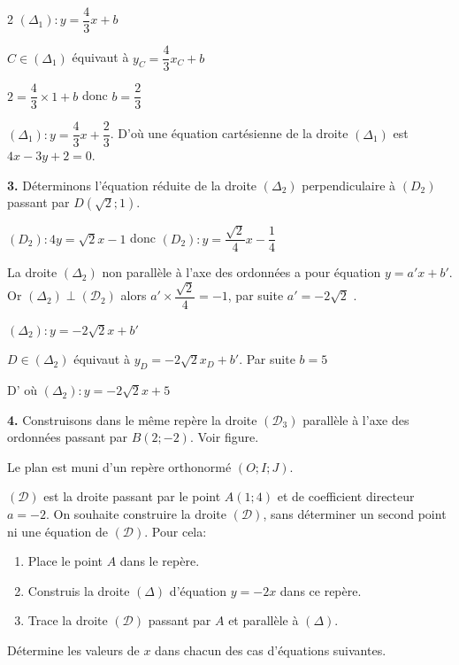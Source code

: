 \begin{multicols*}{2}
  	$({\Delta}_{1}): y=\dfrac{4}{3}x+b$ 
  	
  	$C\in ({\Delta}_{1})$ équivaut à $y_{C}=\dfrac{4}{3}x_{C}+b$
  	
  	$2=\dfrac{4}{3}\times 1+b$ donc $b=\dfrac{2}{3}$
  	
  	$({\Delta}_{1}): y=\dfrac{4}{3}x+\dfrac{2}{3}$.
  	D'où une équation cartésienne de la droite $({\Delta}_{1})$ est $4x-3y+2=0$.
  	
  	\textbf{3.} Déterminons l'équation réduite de la droite $({\Delta}_{2})$ perpendiculaire à  $({D}_{2})$ passant par $D(\sqrt{2};1)$.
  	
  	$({D}_{2}): 4y=\sqrt{2}x-1$ donc $({D}_{2}): y=\dfrac{\sqrt{2}}{4}x-\dfrac{1}{4}$
  	
  	La droite $({\Delta}_{2})$ non parallèle à l'axe des ordonnées a pour équation $ y=a'x+b'$. Or $({\Delta}_{2}) \perp (\mathcal{D}_{2})$ alors $a'\times  \dfrac{\sqrt{2}}{4} =-1$, par suite $a'=-2\sqrt{2}$ .
  	
  	$({\Delta}_{2}): y=-2\sqrt{2}x+b'$
  	
  	$D\in({\Delta}_{2})$ équivaut à $y_{D}=-2\sqrt{2}x_{D}+b'$. Par suite $b=5$
  	
  	D' où $({\Delta}_{2}): y=-2\sqrt{2}x+5$
  	
  	\textbf{4.} Construisons dans le même repère la droite $(\mathcal{D}_{3})$ parallèle à l'axe des ordonnées passant par $B(2;-2)$. Voir figure.
  	
  	\begin{center}
  	\end{center}
  	\begin{center}
  	\end{center}
  	Le plan est muni d'un  repère orthonormé $\left(O; I;J\right)$.
  	
  	$(\mathcal{D})$ est la droite passant par le point  $A(1;4)$ et de coefficient directeur $a=-2$. On souhaite construire la droite $(\mathcal{D})$, sans déterminer un second point ni une équation de $(\mathcal{D})$. Pour cela:
  	\begin{enumerate}
  		\item Place le point $A$ dans le repère.
  		\item Construis la droite $(\mathcal{\Delta})$ d'équation $y=-2x$ dans ce repère.
  		\item Trace la droite  $(\mathcal{D})$ passant par $A$ et parallèle à $(\mathcal{\Delta})$.
  	\end{enumerate}
  	\begin{center}
  	\end{center}
  	Détermine les valeurs de $x$ dans chacun des cas d'équations suivantes.
  	

\end{multicols*}
